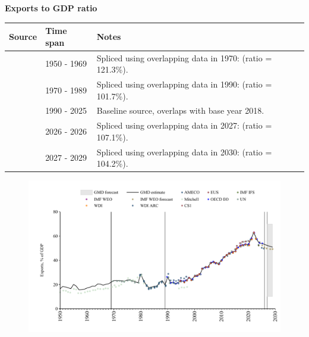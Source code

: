 \documentclass[12pt,a4paper,landscape]{article}
\begin{document}
\begin{adjustbox}{max totalsize={\paperwidth}{\paperheight},center}
\begin{minipage}[t][\textheight][t]{\textwidth}
\vspace*{0.5cm}
{}
\begin{center}
{\Large\bfseries Exports to GDP ratio}
\end{center}
\vspace{0.5cm}
\begin{table}[H]
\centering
\small
\begin{tabular}{|l|l|l|}
\hline
\textbf{Source} & \textbf{Time span} & \textbf{Notes} \\
\hline
\rowcolor{white}\cite{Mitchell}& 1950 - 1969 &Spliced using overlapping data in 1970: (ratio = 121.3\%). \\
\rowcolor{lightgray}\cite{UN}& 1970 - 1989 &Spliced using overlapping data in 1990: (ratio = 101.7\%). \\
\rowcolor{white}\cite{OECD_EO}& 1990 - 2025 &Baseline source, overlaps with base year 2018. \\
\rowcolor{lightgray}\cite{AMECO}& 2026 - 2026 &Spliced using overlapping data in 2027: (ratio = 107.1\%). \\
\rowcolor{white}\cite{IMF_WEO_forecast}& 2027 - 2029 &Spliced using overlapping data in 2030: (ratio = 104.2\%). \\
\hline
\end{tabular}
\end{table}
\begin{figure}[H]
\centering
\includegraphics[width=\textwidth,height=0.6\textheight,keepaspectratio]{graphs/POL_exports_GDP.pdf}
\end{figure}
\end{minipage}
\end{adjustbox}
\end{document}
